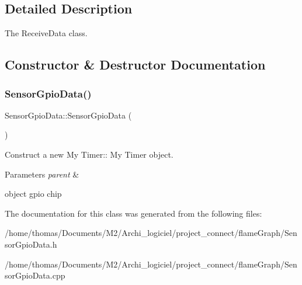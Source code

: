 \subsection{Detailed Description}
The Receive\+Data class. 

\subsection{Constructor \& Destructor Documentation}
\mbox{\label{classSensorGpioData_a040047c46fd1f8f3f50aa17ed93c9360}} 
\subsubsection{\texorpdfstring{Sensor\+Gpio\+Data()}{SensorGpioData()}}
{\footnotesize\ttfamily Sensor\+Gpio\+Data\+::\+Sensor\+Gpio\+Data (\begin{DoxyParamCaption}{ }\end{DoxyParamCaption})}



Construct a new My Timer\+:\+: My Timer object. 


\begin{DoxyParams}{Parameters}
{\em parent} & \\
\hline
\end{DoxyParams}
object gpio chip 

The documentation for this class was generated from the following files\+:\begin{DoxyCompactItemize}
\item 
/home/thomas/\+Documents/\+M2/\+Archi\+\_\+logiciel/project\+\_\+connect/flame\+Graph/Sensor\+Gpio\+Data.\+h\item 
/home/thomas/\+Documents/\+M2/\+Archi\+\_\+logiciel/project\+\_\+connect/flame\+Graph/Sensor\+Gpio\+Data.\+cpp\end{DoxyCompactItemize}
